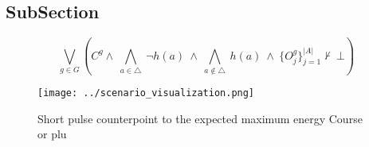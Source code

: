 \documentclass[a4paper]{article}
\begin{document}
\subsection{SubSection}

\[\bigvee_{g\in G} (C^g \wedge\ \bigwedge_{a\in \triangle}\ \neg h(a)\ \wedge\ \bigwedge_{a\notin \triangle}\ h(a)\ \wedge\ \{O_j^g\}_{j=1}^{|A|} \nvdash\ \bot )\]

\begin{figure}
\centering
\texttt{[image: ../scenario\_visualization.png]}
\caption{Short pulse counterpoint to the expected maximum energy Course or plu
}
\end{figure}
 
\end{document}
